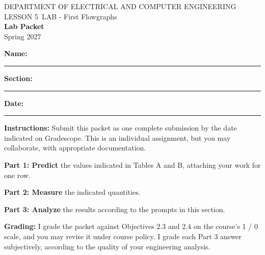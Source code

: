 \documentclass{exam}
\def\labLesson{5}
\def\thisterm{\thisTermIn}
\def\thisterm{Spring 2027}
\begin{document}
\pagestyle{headandfoot}
\begin{Form}

\begin{center}
DEPARTMENT OF ELECTRICAL AND COMPUTER ENGINEERING \\
LESSON \labLesson\ LAB - First Flowgraphs \\
\textbf{Lab Packet} \\
\thisterm \\[4mm]
\end{center}

\vspace{-4pt}
\textbf{Name:} \rule[-2pt]{2.6in}{0.4pt} \hfill
\textbf{Section:} \rule[-2pt]{0.9in}{0.4pt} \hfill
\textbf{Date:} \rule[-2pt]{1.1in}{0.4pt}

\vspace{4pt}


\textbf{Instructions:} Submit this packet as one complete submission by the date indicated on Gradescope. This is an individual assignment, but you may collaborate, with appropriate documentation. 

\textbf{Part 1: Predict}
the values indicated in Tables A and B, attaching your work for one row. 

\textbf{Part 2: Measure} the indicated quantities. 

\textbf{Part 3: Analyze} the results according to the prompts in this section.

\textbf{Grading:} I grade the packet against Objectives 2.3 and 2.4 on the course's 1 / 0 scale, and you may revise it under course policy. I grade each Part 3 answer subjectively, according to the quality of your engineering analysis.

\begin{procbox}
\end{procbox}


\end{Form}
\end{document}
